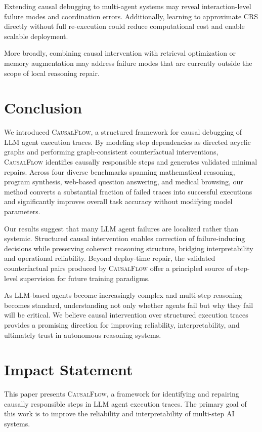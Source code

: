 \documentclass{article}
\theoremstyle{plain}
\theoremstyle{definition}
\theoremstyle{remark}
\begin{document}
Extending causal debugging to multi-agent systems may reveal interaction-level failure modes and coordination errors. Additionally, learning to approximate CRS directly without full re-execution could reduce computational cost and enable scalable deployment.

More broadly, combining causal intervention with retrieval optimization or memory augmentation may address failure modes that are currently outside the scope of local reasoning repair.


\section{Conclusion}

We introduced \textsc{CausalFlow}, a structured framework for causal debugging of LLM agent execution traces. By modeling step dependencies as directed acyclic graphs and performing graph-consistent counterfactual interventions, \textsc{CausalFlow} identifies causally responsible steps and generates validated minimal repairs. Across four diverse benchmarks spanning mathematical reasoning, program synthesis, web-based question answering, and medical browsing, our method converts a substantial fraction of failed traces into successful executions and significantly improves overall task accuracy without modifying model parameters.

Our results suggest that many LLM agent failures are localized rather than systemic. Structured causal intervention enables correction of failure-inducing decisions while preserving coherent reasoning structure, bridging interpretability and operational reliability. Beyond deploy-time repair, the validated counterfactual pairs produced by \textsc{CausalFlow} offer a principled source of step-level supervision for future training paradigms.

As LLM-based agents become increasingly complex and multi-step reasoning becomes standard, understanding not only whether agents fail but why they fail will be critical. We believe causal intervention over structured execution traces provides a promising direction for improving reliability, interpretability, and ultimately trust in autonomous reasoning systems.



\section*{Impact Statement}

This paper presents \textsc{CausalFlow}, a framework for identifying and repairing causally responsible steps in LLM agent execution traces. The primary goal of this work is to improve the reliability and interpretability of multi-step AI systems.
\end{document}
